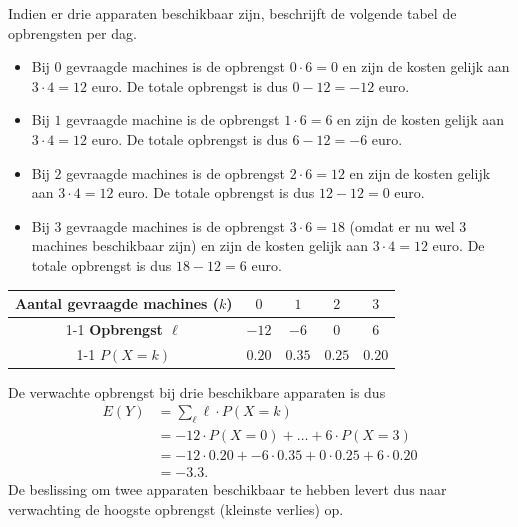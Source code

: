 \begin{enumerate}[label=(\alph*)]
{            Indien er drie apparaten beschikbaar zijn, beschrijft de volgende tabel de opbrengsten per dag.
            \begin{itemize}
                \item Bij $0$ gevraagde machines is de opbrengst $0 \cdot 6=0$ en zijn de kosten gelijk aan $3 \cdot 4=12$ euro.
                De totale opbrengst is dus $0 - 12 = -12$ euro.
                \item Bij $1$ gevraagde machine is de opbrengst $1 \cdot 6=6$ en zijn de kosten gelijk aan $3 \cdot 4=12$ euro.
                De totale opbrengst is dus $6 - 12 = -6$ euro.
                \item Bij $2$ gevraagde machines is de opbrengst $2 \cdot 6=12$ en zijn de kosten gelijk aan $3 \cdot 4=12$ euro.
                De totale opbrengst is dus $12 - 12 = 0$ euro.
                \item Bij $3$ gevraagde machines is de opbrengst $3 \cdot 6=18$ (omdat er nu wel 3 machines beschikbaar zijn) en zijn de kosten gelijk aan $3 \cdot 4=12$ euro.
                De totale opbrengst is dus $18 - 12 = 6$ euro.
            \end{itemize}
            
            \begin{center}
                \begin{tabular}{ccccc}
                    \toprule
                        {\bfseries Aantal gevraagde machines ($k$)} & $0$ & $1$ & $2$ & $3$ \\        
                        \cmidrule{1-1} \cmidrule{2-2} \cmidrule{3-3} \cmidrule{4-4} \cmidrule{5-5}
                        {\bfseries Opbrengst $\ell$} & $-12$ & $-6$ & $0$ & $6$ \\        
                        \cmidrule{1-1} \cmidrule{2-2} \cmidrule{3-3} \cmidrule{4-4} \cmidrule{5-5}
                        {\bfseries $P(X=k)$} & $0.20$ & $0.35$ & $0.25$ & $0.20$ \\
                    \bottomrule
                \end{tabular}
            \end{center}
            De verwachte opbrengst bij drie beschikbare apparaten is dus
            \begin{align*}
                E(Y)    &= \sum_\ell \ell \cdot P(X=k) \\
                        &=  -12 \cdot P(X=0) + \ldots + 6 \cdot P(X=3) \\
                        &= -12 \cdot 0.20 + -6 \cdot 0.35 + 0 \cdot 0.25 + 6 \cdot 0.20 \\
                        &= -3.3.
            \end{align*}
            De beslissing om twee apparaten beschikbaar te hebben levert dus naar verwachting de hoogste opbrengst (kleinste verlies) op.
        }
\end{enumerate}